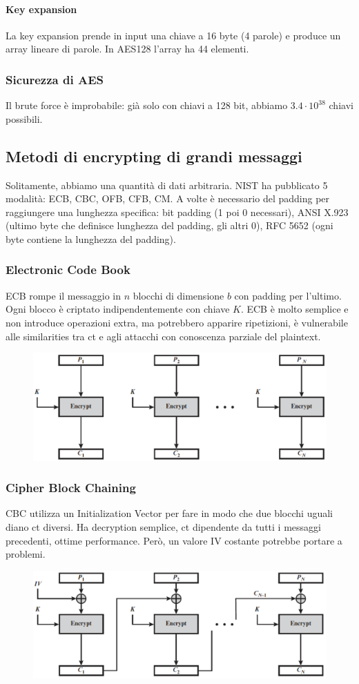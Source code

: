 \documentclass[11pt]{article}
\begin{document}
\paragraph{Key expansion} La key expansion prende in input una chiave a 16 byte (4 parole) e produce un array lineare di parole. In AES128 l'array ha 44 elementi. 

\subsubsection{Sicurezza di AES}
Il brute force è improbabile: già solo con chiavi a 128 bit, abbiamo $3.4\cdot 10^{38}$ chiavi possibili. 
\subsection{Metodi di encrypting di grandi messaggi}
Solitamente, abbiamo una quantità di dati arbitraria. NIST ha pubblicato 5 modalità: ECB, CBC, OFB, CFB, CM. A volte è necessario del padding per raggiungere una lunghezza specifica: bit padding (1 poi 0 necessari), ANSI X.923 (ultimo byte che definisce lunghezza del padding, gli altri 0), RFC 5652 (ogni byte contiene la lunghezza del padding). 
\subsubsection{Electronic Code Book}
ECB rompe il messaggio in $n$ blocchi di dimensione $b$ con padding per l'ultimo. Ogni blocco è criptato indipendentemente con chiave $K$. ECB è molto semplice e non introduce operazioni extra, ma potrebbero apparire ripetizioni, è vulnerabile alle similarities tra ct e agli attacchi con conoscenza parziale del plaintext.
\begin{figure}[H]
    \centering
    \includegraphics[width=0.6\linewidth]{res/crypto/ECB.png}
\end{figure}
\subsubsection{Cipher Block Chaining}
CBC utilizza un Initialization Vector per fare in modo che due blocchi uguali diano ct diversi. Ha decryption semplice, ct dipendente da tutti i messaggi precedenti, ottime performance. Però, un valore IV costante potrebbe portare a problemi.
\begin{figure}[H]
    \centering
    \includegraphics[width=0.6\linewidth]{res/crypto/CBC.png}
\end{figure}
\end{document}

